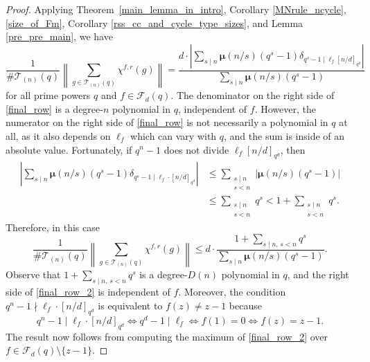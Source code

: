 \documentclass[Unicode,ALCO]{cedram}
\newcommand{\CF}{\mathcal{F}}
\newcommand{\CT}{\mathcal{T}}
\newcommand{\moebius}{\pmb{\mu}}
\begin{document}
\begin{proof}
Applying Theorem~\ref{main_lemma_in_intro}, Corollary \ref{MNrule_ncycle}, \eqref{size_of_Fm}, Corollary \ref{rss_cc_and_cycle_type_sizes}, and Lemma \ref{pre_pre_main}, we have
\begin{equation}
\label{final_row}
\frac{
1
}{
\# \CT_{(n)} (q)
}
\left \|
\sum_{g \in \CT_{(n)} (q)} \chi^{f,r} (g)
\right \|
=
\frac{d \cdot \left | \sum_{s \mid n} \moebius(n/s)(q^s-1) \delta_{q^s - 1 \mid \ell_{f} [n/d]_{q^d}} \right | }{\sum_{s \mid n} \moebius(n/s)(q^s-1)}
\end{equation}
for all prime powers \(q\) and \(f \in \CF_d (q)\).
The denominator on the right side of \eqref{final_row} is a degree-\(n\) polynomial in \(q\), independent of \(f\).
However, the numerator on the right side of \eqref{final_row} is not necessarily a polynomial in \(q\) at all, as it also depends on \(\ell_{f}\) which can vary with \(q\), and the sum is inside of an absolute value.
Fortunately, if \(q^n - 1\) does not divide \(\ell_{f} [n/d]_{q^d}\), then
\begin{equation}
\label{D_n_bound}
\begin{aligned}
\left | \sum_{s \mid n} \moebius(n/s) (q^s-1) \delta_{q^s-1 \mid \ell_f \cdot [n/d]_{q^d}} \right |
& \leq
\sum_{\substack{s \mid n \\ s < n}}
\left | \moebius (n/s) (q^s-1) \right | \\
& \leq
\sum_{\substack{s \mid n \\ s < n}}
q^s
<
1 + \sum_{\substack{s \mid n \\ s < n}}
q^s.
\end{aligned}
\end{equation}
Therefore, in this case
\begin{equation}
\label{final_row_2}
\frac{
1
}{
\# \CT_{(n)} (q)
}
\left \|
\sum_{g \in \CT_{(n)} (q)} \chi^{f,r} (g)
\right \|
\leq
d \cdot \frac{1 + \sum_{s \mid n, \, s< n} q^s }{\sum_{s \mid n} \moebius(n/s)(q^s-1)}.
\end{equation}
Observe that \(1 + \sum_{s \mid n, \, s < n} q^s\) is a degree-\(D(n)\) polynomial in \(q\), and the right side of \eqref{final_row_2} is independent of \(f\).
Moreover, the condition \(q^n-1 \nmid \ell_f \cdot [n/d]_{q^d}\) is equivalent to \(f(z) \neq z-1\) because
\[
q^n-1 \mid \ell_f \cdot [n/d]_{q^d}
\iff q^d-1 \mid \ell_f
\iff f(1) = 0
\iff f(z) = z-1.
\]
The result now follows from computing the maximum of \eqref{final_row_2} over \mbox{\(f \in \CF_d(q) \setminus \{z-1\}\).}
\end{proof}
\end{document}
